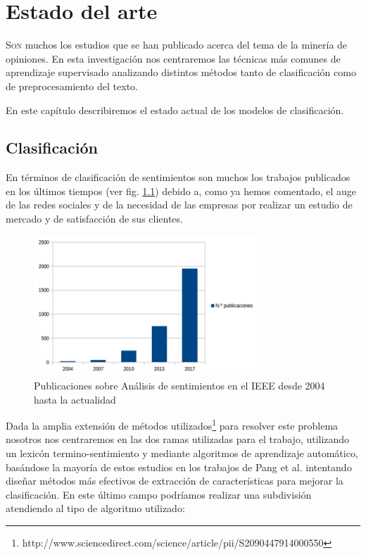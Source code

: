 

\chapter{Estado del arte}

\lettrine{S}{on} muchos los estudios que se han publicado acerca del tema de la minería de opiniones. En esta investigación nos centraremos las técnicas más comunes de aprendizaje supervisado analizando distintos métodos tanto de clasificación como de preprocesamiento del texto.

En este capítulo describiremos el estado actual de los modelos de clasificación.

\section{Clasificación}
En términos de clasificación de sentimientos son muchos los trabajos publicados en los últimos tiempos (ver fig. \ref{pubsent}) debido a, como ya hemos comentado, el auge de las redes sociales y de la necesidad de las empresas por realizar un estudio de mercado y de satisfacción de sus clientes.

\begin{figure}[!ht]
	\centering
	\includegraphics[width=0.75\textwidth]{imaxes/pubsentAnalisis.png}
	\caption{Publicaciones sobre Análisis de sentimientos en el IEEE desde 2004 hasta la actualidad}
		\label{pubsent}
\end{figure}

Dada la amplia extensión de métodos utilizados\footnote{http://www.sciencedirect.com/science/article/pii/S2090447914000550} para resolver este problema nosotros nos centraremos en las dos ramas utilizadas para el trabajo, utilizando un lexicón termino-sentimiento \cite{PabloG} y mediante algoritmos de aprendizaje automático, basándose la mayoría de estos estudios en los trabajos de Pang et al. \cite{Pang} intentando diseñar métodos más efectivos de extracción de características para mejorar la clasificación. En este último campo podríamos realizar una subdivisión atendiendo al tipo de algoritmo utilizado:

